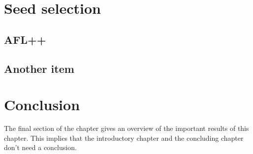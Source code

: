 \section{Seed selection}

\subsection{AFL++}




\subsection{Another item}


\section{Conclusion}
The final section of the chapter gives an overview of the important results
of this chapter. This implies that the introductory chapter and the
concluding chapter don't need a conclusion.


